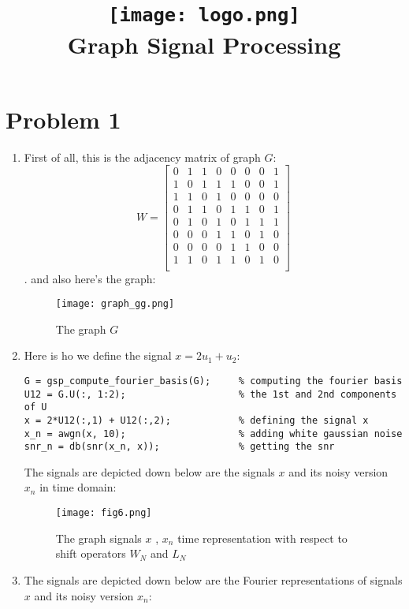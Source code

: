 \documentclass{article}
\title{
    \texttt{[image: logo.png]} \\ %
    Graph Signal Processing \par \exerciseset
}
\author{\SecondAuther }
\begin{document}
\maketitle
\section*{Problem 1}
\begin{enumerate}
    \item First of all, this is the adjacency matrix of graph $G$:
    \begin{equation*}
        W = 
        \begin{bmatrix}
        0 & 1 & 1 & 0 & 0 & 0 & 0 & 1 \\
        1 & 0 & 1 & 1 & 1 & 0 & 0 & 1 \\ 
        1 & 1 & 0 & 1 & 0 & 0 & 0 & 0 \\ 
        0 & 1 & 1 & 0 & 1 & 1 & 0 & 1 \\ 
        0 & 1 & 0 & 1 & 0 & 1 & 1 & 1 \\ 
        0 & 0 & 0 & 1 & 1 & 0 & 1 & 0 \\ 
        0 & 0 & 0 & 0 & 1 & 1 & 0 & 0 \\ 
        1 & 1 & 0 & 1 & 1 & 0 & 1 & 0 \\ 
        \end{bmatrix}
    \end{equation*}.
    and also here's the graph:
    \begin{figure}[h!]
        \centering
        \texttt{[image: graph\_gg.png]} 
        \caption{The graph $G$}
        \label{fig:gr1}
    \end{figure}
    \item Here is ho we define the signal $x= 2u_1 + u_2$:
\begin{lstlisting}
G = gsp_compute_fourier_basis(G);     % computing the fourier basis
U12 = G.U(:, 1:2);                    % the 1st and 2nd components of U
x = 2*U12(:,1) + U12(:,2);            % defining the signal x
x_n = awgn(x, 10);                    % adding white gaussian noise
snr_n = db(snr(x_n, x));              % getting the snr 
\end{lstlisting}
    The signals are depicted down below are the signals $x$ and its noisy version $x_n$ in time domain:
    
    \begin{figure}[h!]
        \centering
        \texttt{[image: fig6.png]} 
        \caption{The graph signals $x$ , $x_n$ time representation with respect to shift operators $W_N$ and $L_N$}
        \label{fig:gr3}
    \end{figure}
    \item The signals are depicted down below are the  Fourier representations of signals $x$ and its noisy version $x_n$:


\end{enumerate}
\end{document}

